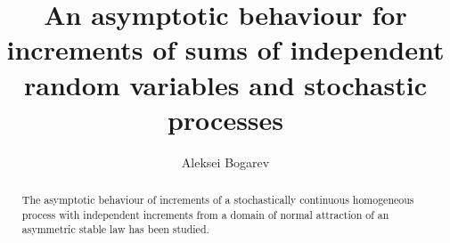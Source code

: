 \begin{englishtitle} %
\title{An asymptotic behaviour for increments of sums of independent random variables and stochastic processes}
\author{Aleksei Bogarev}

\maketitle

\begin{abstract}
The asymptotic behaviour of increments of a stochastically continuous homogeneous process with independent increments from a domain of normal attraction of an asymmetric stable law has been studied.

\end{abstract}
\end{englishtitle}

\iffalse
%
%


\documentclass[12pt]{llncs}  


\usepackage{iftex}

\ifPDFTeX
\usepackage[T2A]{fontenc}
\usepackage[utf8]{inputenc} %
\usepackage[english,russian]{babel}
\fi

\usepackage{todonotes} 

\usepackage[russian]{nla}

\usepackage{cmap} %

\usepackage{amsmath,amssymb}

\renewcommand{\P}{\mathbb{P}}
\newcommand{\Exp}{\mathbb{E}}
\newcommand{\Z}{\mathbb{Z}}


\theoremstyle{remark}
\newtheorem{rem}{Замечание}



